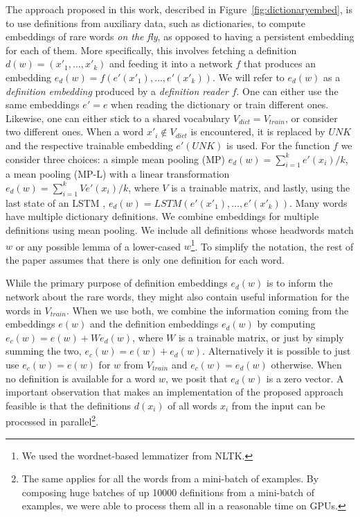 The approach proposed in this work, described in Figure~\ref{fig:dictionaryembed}, is to use definitions from auxiliary data, such as dictionaries, to compute embeddings of rare words \textit{on the fly}, as opposed to having a persistent embedding for each of them. More specifically, this involves fetching a definition $d(w) = (x'_1,\ldots,x'_k)$ and feeding it into a network $f$
that produces an embedding $e_d(w)=f(e'(x'_1),\ldots,e'(x'_k))$. We will refer to $e_d(w)$ as a \textit{definition embedding} produced by a \textit{definition reader} $f$. One can either use the same embeddings $e'=e$ when reading the dictionary or train different ones. Likewise, one can either stick to a shared vocabulary $V_{dict} = V_{train}$, or consider two different ones. When a word $x'_i \not\in V_{dict}$ is encountered, it is replaced by $\mathit{UNK}$ and the respective trainable embedding $e'(\mathit{UNK})$ is used. For the function $f$ we consider three choices: a simple mean pooling (MP) $e_d(w) = \sum_{i=1}^k e'(x_i) / k$, a mean pooling (MP-L) with a linear transformation
$e_d(w)=\sum_{i=1}^k V e'(x_i) / k$, where $V$ is a trainable matrix, and lastly, using the last state of an LSTM \citep{hochreiter97lstm}, $e_d(w) = LSTM(e'(x'_1),\ldots,e'(x'_k))$. Many words have multiple dictionary definitions. We combine embeddings for multiple definitions using mean pooling. We include all definitions whose headwords match $w$
or any possible lemma of a lower-cased $w$\footnote{We used the wordnet-based lemmatizer from NLTK.}. To simplify the notation, the rest of the paper assumes that there is only one definition for each word.

While the primary purpose of definition embeddings $e_d(w)$ is to inform the network about the rare words, they might
also contain useful information for the words in $V_{train}$. When we use both, we combine the information coming from the embeddings $e(w)$ and the definition embeddings $e_d(w)$ by computing $e_c(w) = e(w) + W e_d(w)$, where $W$ is a trainable matrix, or just by simply summing the two, $e_c(w)=e(w) + e_d(w)$.
Alternatively it is possible to just use $e_c(w)=e(w)$ for $w$ from $V_{train}$ and $e_c(w)=e_d(w)$ otherwise. When no definition is available for a word $w$, we posit that $e_d(w)$ is a zero vector. A important observation that makes an implementation of the proposed approach feasible is that the definitions $d(x_i)$ of all words $x_i$ from the input can be processed in parallel\footnote{The same applies for all the words from a mini-batch of examples. By composing huge batches of up 10000 definitions from a mini-batch of examples, we were able to process them all in a reasonable time on GPUs.}.


